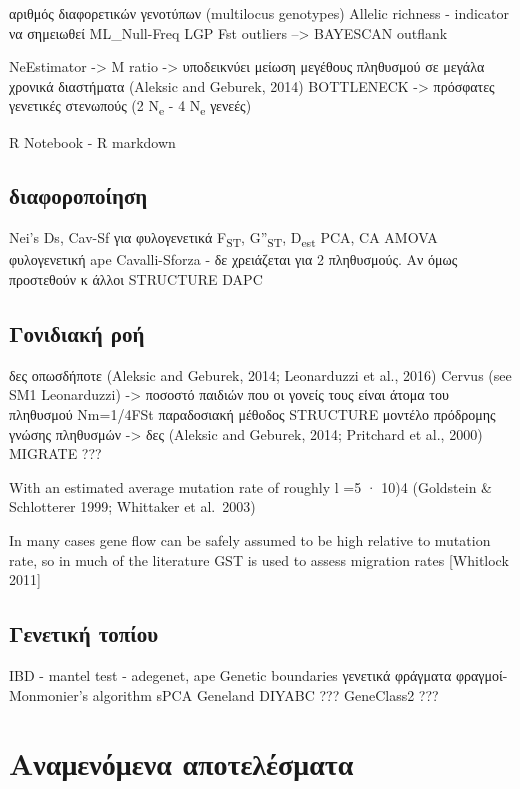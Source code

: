 \documentclass[12pt,a4paper,]{report}
\begin{document}
αριθμός διαφορετικών γενοτύπων (multilocus genotypes) Allelic richness -
indicator να σημειωθεί ML\_Null-Freq LGP Fst outliers --\textgreater{}
BAYESCAN outflank

NeEstimator -\textgreater{} M ratio -\textgreater{} υποδεικνύει μείωση
μεγέθους πληθυσμού σε μεγάλα χρονικά διαστήματα (Aleksic and Geburek,
2014) BOTTLENECK -\textgreater{} πρόσφατες γενετικές στενωπούς (2
N\textsubscript{e} - 4 N\textsubscript{e} γενεές)

R Notebook - R markdown

\subsection{διαφοροποίηση}

Nei's Ds, Cav-Sf για φυλογενετικά F\textsubscript{ST},
G''\textsubscript{ST}, D\textsubscript{est} PCA, CA AMOVA φυλογενετική
ape Cavalli-Sforza - δε χρειάζεται για 2 πληθυσμούς. Αν όμως προστεθούν
κ άλλοι STRUCTURE DAPC

\hypertarget{-}{%
\subsection{Γονιδιακή ροή}\label{-}}

δες οπωσδήποτε (Aleksic and Geburek, 2014; Leonarduzzi et al., 2016)
Cervus (see SM1 Leonarduzzi) -\textgreater{} ποσοστό παιδιών που οι
γονείς τους είναι άτομα του πληθυσμού Nm=1/4FSt παραδοσιακή μέθοδος
STRUCTURE μοντέλο πρόδρομης γνώσης πληθυσμών -\textgreater{} δες
(Aleksic and Geburek, 2014; Pritchard et al., 2000) MIGRATE ???

With an estimated average mutation rate of roughly l =5 · 10)4
(Goldstein \& Schlotterer 1999; Whittaker et al.~2003)

In many cases gene flow can be safely assumed to be high relative to
mutation rate, so in much of the literature GST is used to assess
migration rates {[}Whitlock 2011{]}

\hypertarget{-}{%
\subsection{Γενετική τοπίου}\label{-}}

IBD - mantel test - adegenet, ape Genetic boundaries γενετικά φράγματα
φραγμοί- Monmonier's algorithm sPCA Geneland DIYABC ??? GeneClass2 ???

\hypertarget{-}{%
\section{Αναμενόμενα αποτελέσματα}\label{-}}
\end{document}
